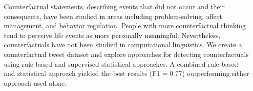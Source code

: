 Counterfactual statements, describing events that did not occur and their consequents, have been studied in areas including problem-solving, affect management, and behavior regulation. People with more counterfactual thinking tend to perceive life events as more personally meaningful. Nevertheless, counterfactuals have not been studied in computational linguistics. We create a counterfactual tweet dataset and explore approaches for detecting counterfactuals using rule-based and supervised statistical approaches. A combined rule-based and statistical approach yielded the best results (F1 = 0.77) outperforming either approach used alone.
